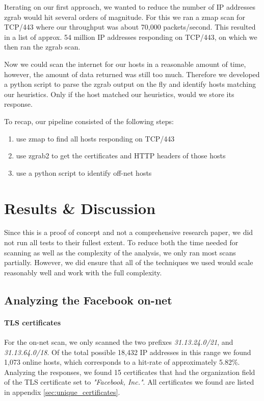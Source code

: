 \documentclass[sigconf,10pt,nonacm]{acmart}
\begin{document}
Iterating on our first approach, we wanted to reduce the number of IP addresses zgrab would hit several orders of magnitude. For this we ran a zmap scan for TCP/443 where our throughput was about 70,000 packets/second. This resulted in a list of approx. 54 million IP addresses responding on TCP/443, on which we then ran the zgrab scan.

Now we could scan the internet for our hosts in a reasonable amount of time, however, the amount of data returned was still too much. Therefore we developed a python script to parse the zgrab output on the fly and identify hosts matching our heuristics. Only if the host matched our heuristics, would we store its response.

To recap, our pipeline consisted of the following steps:
\begin{enumerate}
    \item use zmap to find all hosts responding on TCP/443
    \item use zgrab2 to get the certificates and HTTP headers of those hosts
    \item use a python script to identify off-net hosts
\end{enumerate}

\section{Results \& Discussion}

Since this is a proof of concept and not a comprehensive research paper, we did not run all tests to their fullest extent. To reduce both the time needed for scanning as well as the complexity of the analysis, we only ran most scans partially. However, we did ensure that all of the techniques we used would scale reasonably well and work with the full complexity.

\subsection{Analyzing the Facebook on-net}

\paragraph{TLS certificates} For the on-net scan, we only scanned the two prefixes \textit{31.13.24.0/21}, and \textit{31.13.64.0/18}. Of the total possible 18,432 IP addresses in this range we found 1,073 online hosts, which corresponds to a hit-rate of approximately 5.82\%. Analyzing the responses, we found 15 certificates that had the organization field of the TLS certificate set to \textit{"Facebook, Inc."}. All certificates we found are listed in appendix \ref{sec:unique_certificates}.
\end{document}
